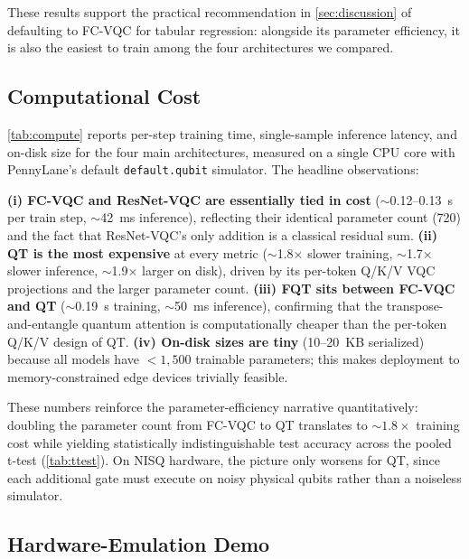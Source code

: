 \documentclass[10pt,conference]{IEEEtran}
\begin{document}
These results support the practical recommendation in \cref{sec:discussion} of defaulting to FC-VQC for tabular regression: alongside its parameter efficiency, it is also the easiest to train among the four architectures we compared.

\subsection{Computational Cost}
\label{sec:results-compute}

\cref{tab:compute} reports per-step training time, single-sample inference latency, and on-disk size for the four main architectures, measured on a single CPU core with PennyLane's default \texttt{default.qubit} simulator.
The headline observations:



\textbf{(i) FC-VQC and ResNet-VQC are essentially tied in cost} ($\sim$0.12--0.13~s per train step, $\sim$42~ms inference), reflecting their identical parameter count (720) and the fact that ResNet-VQC's only addition is a classical residual sum.
\textbf{(ii) QT is the most expensive} at every metric ($\sim$1.8${\times}$ slower training, $\sim$1.7${\times}$ slower inference, $\sim$1.9${\times}$ larger on disk), driven by its per-token Q/K/V VQC projections and the larger parameter count.
\textbf{(iii) FQT sits between FC-VQC and QT} ($\sim$0.19~s training, $\sim$50~ms inference), confirming that the transpose-and-entangle quantum attention is computationally cheaper than the per-token Q/K/V design of QT.
\textbf{(iv) On-disk sizes are tiny} (10--20~KB serialized) because all models have ${<}\!1{,}500$ trainable parameters; this makes deployment to memory-constrained edge devices trivially feasible.

These numbers reinforce the parameter-efficiency narrative quantitatively: doubling the parameter count from FC-VQC to QT translates to ${\sim}1.8\times$ training cost while yielding statistically indistinguishable test accuracy across the pooled t-test (\cref{tab:ttest}). On NISQ hardware, the picture only worsens for QT, since each additional gate must execute on noisy physical qubits rather than a noiseless simulator.

\subsection{Hardware-Emulation Demo}
\label{sec:results-hwdemo}
\end{document}
